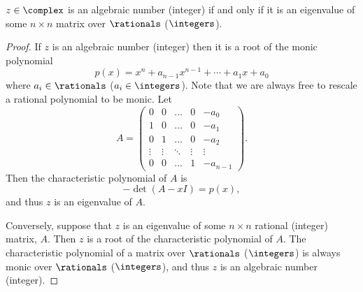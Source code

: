\begin{lma}{}{}
    \(z \in \complex\) is an algebraic number (integer) if and only if it is an eigenvalue of some \(n \times n\) matrix over \(\rationals\) (\(\integers\)).
    \begin{proof}
        If \(z\) is an algebraic number (integer) then it is a root of the monic polynomial
        \begin{equation}
            p(x) = x^n + a_{n-1}x^{n-1} + \dotsb + a_1x + a_0
        \end{equation}
        where \(a_i \in \rationals\) (\(a_i \in \integers\)).
        Note that we are always free to rescale a rational polynomial to be monic.
        Let
        \begin{equation}
            A = 
            \begin{pmatrix}
                0 & 0 & \dots & 0 & -a_0\\
                1 & 0 & \dots & 0 & -a_1\\
                0 & 1 & \dots & 0 &  -a_2\\
                \vdots & \vdots & \ddots & \vdots & \vdots\\
                0 & 0 & \dots & 1 & -a_{n-1}
            \end{pmatrix}
            .
        \end{equation}
        Then the characteristic polynomial of \(A\) is
        \begin{equation}
            -\det(A - x I) = p(x),
        \end{equation}
        and thus \(z\) is an eigenvalue of \(A\).
        
        Conversely, suppose that \(z\) is an eigenvalue of some \(n \times n\) rational (integer) matrix, \(A\).
        Then \(z\) is a root of the characteristic polynomial of \(A\).
        The characteristic polynomial of a matrix over \(\rationals\) (\(\integers\)) is always monic over \(\rationals\) (\(\integers\)), and thus \(z\) is an algebraic number (integer).
    \end{proof}
\end{lma}

